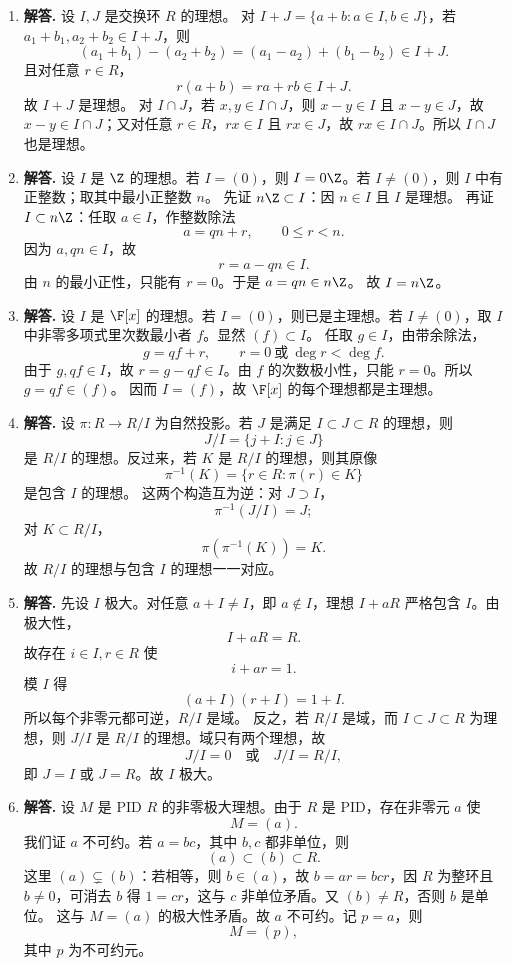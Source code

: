 \begin{enumerate}[label=\textbf{\arabic*.}, leftmargin=*, itemsep=1em]
  \item \textbf{解答.} 设 $I,J$ 是交换环 $R$ 的理想。  
  对 $I+J=\{a+b:a\in I,b\in J\}$，若 $a_1+b_1,a_2+b_2\in I+J$，则
  \[
  (a_1+b_1)-(a_2+b_2)=(a_1-a_2)+(b_1-b_2)\in I+J.
  \]
  且对任意 $r\in R$，
  \[
  r(a+b)=ra+rb\in I+J.
  \]
  故 $I+J$ 是理想。  
  对 $I\cap J$，若 $x,y\in I\cap J$，则 $x-y\in I$ 且 $x-y\in J$，故 $x-y\in I\cap J$；又对任意 $r\in R$，$rx\in I$ 且 $rx\in J$，故 $rx\in I\cap J$。所以 $I\cap J$ 也是理想。

  \item \textbf{解答.} 设 $I$ 是 $\Z$ 的理想。若 $I=(0)$，则 $I=0\Z$。若 $I\neq(0)$，则 $I$ 中有正整数；取其中最小正整数 $n$。  
  先证 $n\Z\subset I$：因 $n\in I$ 且 $I$ 是理想。  
  再证 $I\subset n\Z$：任取 $a\in I$，作整数除法
  \[
  a=qn+r,\qquad 0\le r<n.
  \]
  因为 $a,qn\in I$，故
  \[
  r=a-qn\in I.
  \]
  由 $n$ 的最小正性，只能有 $r=0$。于是 $a=qn\in n\Z$。  
  故 $I=n\Z$。

  \item \textbf{解答.} 设 $I$ 是 $\F[x]$ 的理想。若 $I=(0)$，则已是主理想。若 $I\neq(0)$，取 $I$ 中非零多项式里次数最小者 $f$。显然 $(f)\subset I$。  
  任取 $g\in I$，由带余除法，
  \[
  g=qf+r,\qquad r=0\ \text{或}\ \deg r<\deg f.
  \]
  由于 $g,qf\in I$，故 $r=g-qf\in I$。由 $f$ 的次数极小性，只能 $r=0$。所以 $g=qf\in(f)$。  
  因而 $I=(f)$，故 $\F[x]$ 的每个理想都是主理想。

  \item \textbf{解答.} 设 $\pi:R\to R/I$ 为自然投影。若 $J$ 是满足 $I\subset J\subset R$ 的理想，则
  \[
  J/I=\{j+I:j\in J\}
  \]
  是 $R/I$ 的理想。反过来，若 $K$ 是 $R/I$ 的理想，则其原像
  \[
  \pi^{-1}(K)=\{r\in R:\pi(r)\in K\}
  \]
  是包含 $I$ 的理想。  
  这两个构造互为逆：对 $J\supset I$，
  \[
  \pi^{-1}(J/I)=J;
  \]
  对 $K\subset R/I$，
  \[
  \pi(\pi^{-1}(K))=K.
  \]
  故 $R/I$ 的理想与包含 $I$ 的理想一一对应。

  \item \textbf{解答.} 先设 $I$ 极大。对任意 $a+I\neq I$，即 $a\notin I$，理想 $I+aR$ 严格包含 $I$。由极大性，
  \[
  I+aR=R.
  \]
  故存在 $i\in I,r\in R$ 使
  \[
  i+ar=1.
  \]
  模 $I$ 得
  \[
  (a+I)(r+I)=1+I.
  \]
  所以每个非零元都可逆，$R/I$ 是域。  
  反之，若 $R/I$ 是域，而 $I\subset J\subset R$ 为理想，则 $J/I$ 是 $R/I$ 的理想。域只有两个理想，故
  \[
  J/I=0 \quad\text{或}\quad J/I=R/I,
  \]
  即 $J=I$ 或 $J=R$。故 $I$ 极大。

  \item \textbf{解答.} 设 $M$ 是 PID $R$ 的非零极大理想。由于 $R$ 是 PID，存在非零元 $a$ 使
  \[
  M=(a).
  \]
  我们证 $a$ 不可约。若 $a=bc$，其中 $b,c$ 都非单位，则
  \[
  (a)\subset (b)\subset R.
  \]
  这里 $(a)\subsetneq (b)$：若相等，则 $b\in(a)$，故 $b=ar=bcr$，因 $R$ 为整环且 $b\neq0$，可消去 $b$ 得 $1=cr$，这与 $c$ 非单位矛盾。又 $(b)\neq R$，否则 $b$ 是单位。  
  这与 $M=(a)$ 的极大性矛盾。故 $a$ 不可约。记 $p=a$，则
  \[
  M=(p),
  \]
  其中 $p$ 为不可约元。


\end{enumerate}
